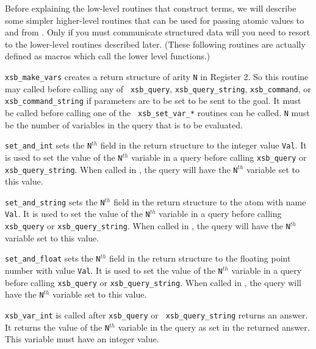 Before explaining the low-level routines that construct terms, we will
describe some simpler higher-level routines that can be used for
passing atomic values to and from \ourprolog.  Only if you must
communicate structured data will you need to resort to the lower-level
routines described later.  (These following routines are actually
defined as macros which call the lower level functions.)

\begin{description}
 
    {\tt xsb\_make\_vars} creates a return structure of arity {\tt N}
in Register 2.  So this routine may called before calling any of {\tt
xsb\_query}, {\tt xsb\_query\_string}, {\tt xsb\_command}, or {\tt
xsb\_command\_string} if parameters are to be set to be sent to the
goal.  It must be called before calling one of the {\tt
xsb\_set\_var\_*} routines can be called. {\tt N} must be the number
of variables in the query that is to be evaluated.

    {\tt set\_and\_int} sets the {\tt N}$^{th}$ field in the return
structure to the integer value {\tt Val}.  It is used to set the value of
the {\tt N}$^{th}$ variable in a query before calling {\tt xsb\_query} or
{\tt xsb\_query\_string}.  When called in \ourprolog, the query will
have the {\tt N}$^{th}$ variable set to this value.

    {\tt set\_and\_string} sets the {\tt N}$^{th}$ field in the return
structure to the atom with name {\tt Val}.  It is used to set the
value of the {\tt N}$^{th}$ variable in a query before calling {\tt
xsb\_query} or {\tt xsb\_query\_string}.  When called in \ourprolog,
the query will have the {\tt N}$^{th}$ variable set to this value.

    {\tt set\_and\_float} sets the {\tt N}$^{th}$ field in the return
structure to the floating point number with value {\tt Val}.  It is
used to set the value of the {\tt N}$^{th}$ variable in a query before
calling {\tt xsb\_query} or {\tt xsb\_query\_string}.  When called in
\ourprolog, the query will have the {\tt N}$^{th}$ variable set to this
value.

 
    {\tt xsb\_var\_int} is called after {\tt xsb\_query} or {\tt
xsb\_query\_string} returns an answer.  It returns the value of the
{\tt N}$^{th}$ variable in the query as set in the returned answer.
This variable must have an integer value.


\end{description}
